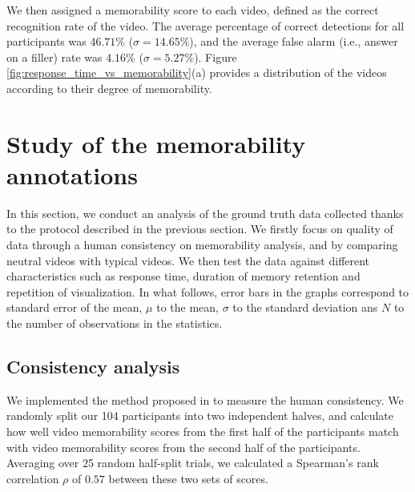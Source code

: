 \documentclass[sigconf]{acmart}
\begin{document}
We then assigned a memorability score to each video, defined as the correct recognition rate of the video.
The average percentage of correct detections for all participants was $46.71\%$ ($\sigma=14.65\%$), and the average false alarm (i.e., answer on a filler) rate was $4.16\%$ ($\sigma=5.27\%$).
Figure \ref{fig:response_time_vs_memorability}(a) provides a distribution of the videos according to their degree of memorability.

\section{Study of the memorability annotations}
In this section, we conduct an analysis of the ground truth data collected thanks to the protocol described in the previous section.
We firstly focus on quality of data through a human consistency on memorability analysis, and by comparing neutral videos with typical videos.
We then test the data against different characteristics such as response time, duration of memory retention and repetition of visualization.
In what follows, error bars in the graphs correspond to standard error of the mean, $\mu$ to the mean, $\sigma$ to the standard deviation ans $N$ to the number of observations in the statistics.

\subsection{Consistency analysis}
We implemented the method proposed in \cite{isola_2014_makes} to measure the human consistency.
We randomly split our 104 participants into two independent halves, and calculate how well video memorability scores from the first half of the participants match with video memorability scores from the second half of the participants.
Averaging over 25 random half-split trials, we calculated a Spearman's rank correlation $\rho$ of $0.57$ between these two sets of scores.
\end{document}
